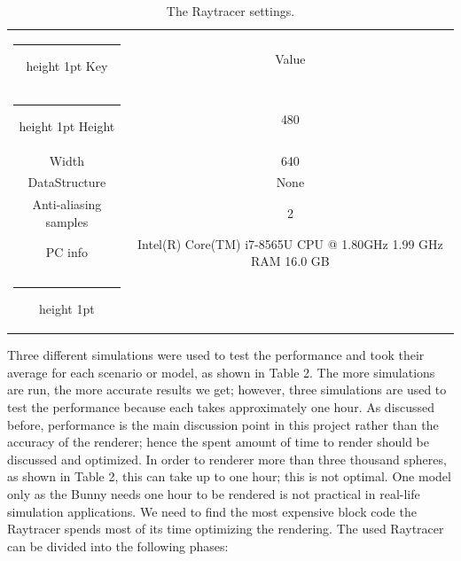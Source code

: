 \documentclass[11pt,a4paper]{article}
\makeatletter
\newcommand{\thickhline}{%
	\noalign {\ifnum 0=`}\fi \hrule height 1pt
	\futurelet \reserved@a \@xhline
}
\makeatother
\begin{document}
	\begin{table}[h]
		\centering
		\begin{tabular}{ c|c  }
			\thickhline%
			Key   &   Value \\
			\thickhline%
			Height   &   480 \\
			
			
			Width   & 640 \\
			
			
			DataStructure   & None \\
			
			
			Anti-aliasing samples  & 2 \\
			
			
			PC info  & 	Intel(R) Core(TM) i7-8565U CPU @ 1.80GHz   1.99 GHz  RAM	16.0 GB\\
			\thickhline%
		\end{tabular}
				\caption{The Raytracer settings.}
	\label{table:2}
	\end{table}
 
 	Three different simulations were used to test the performance and took their average for each scenario or model, as shown in Table 2. The more simulations are run, the more accurate results we get; however, three simulations are used to test the performance because each takes approximately one hour.
 	As discussed before, performance is the main discussion point in this project rather than the accuracy of the renderer; hence the spent amount of time to render should be discussed and optimized. 
 	In order to renderer more than three thousand spheres, as shown in Table 2, this can take up to one hour; this is not optimal. One model only as the Bunny needs one hour to be rendered is not practical in real-life simulation applications.  
 	We need to find the most expensive block code the Raytracer spends most of its time optimizing the rendering. The used Raytracer can be divided into the following phases: 
 	
\end{document}
